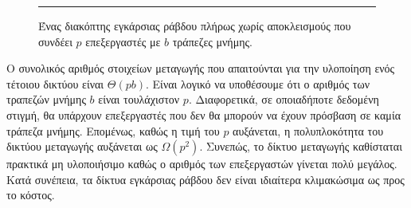 \documentclass[12pt,a4paper]{article}
\begin{document}
\begin{figure}[H]
\noindent\rule{\textwidth}{0.2pt}
\caption{Ένας διακόπτης εγκάρσιας ράβδου πλήρως χωρίς αποκλεισμούς που συνδέει $p$ επεξεργαστές
με $b$ τράπεζες μνήμης.}
\label{fig:graph33}
\end{figure}
\vspace{0.3cm}

Ο συνολικός αριθμός στοιχείων μεταγωγής που απαιτούνται για την υλοποίηση ενός
τέτοιου δικτύου είναι $\Theta(pb)$. Είναι λογικό να υποθέσουμε ότι ο αριθμός των
τραπεζών μνήμης $b$ είναι τουλάχιστον $p$. Διαφορετικά, σε οποιαδήποτε δεδομένη
στιγμή, θα υπάρχουν επεξεργαστές που δεν θα μπορούν να έχουν πρόσβαση σε καμία
τράπεζα μνήμης. Επομένως, καθώς η τιμή του $p$ αυξάνεται, η πολυπλοκότητα του
δικτύου μεταγωγής αυξάνεται ως $\Omega(p^2)$. Συνεπώς, το δίκτυο μεταγωγής
καθίσταται πρακτικά μη υλοποιήσιμο καθώς ο αριθμός των επεξεργαστών γίνεται πολύ
μεγάλος. Κατά συνέπεια, τα δίκτυα εγκάρσιας ράβδου δεν είναι
ιδιαίτερα κλιμακώσιμα ως προς το κόστος.
\end{document}
